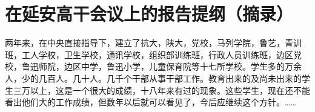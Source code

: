 \section[在延安高干会议上的报告提纲（摘录）（一九三九年六月十日）]{在延安高干会议上的报告提纲（摘录）}


两年来，在中央直接指导下，建立了抗大，陕大，党校，马列学院，鲁艺，青训班，工人学校，卫生学校，通讯学校，组织部训练班，行政人员训练班，边区党校，鲁迅师院，边区中学，鲁迅小学，儿童保育院等十七所学校。学生多的万余人，少的几百人。几十人。几千个干部从事干部工作。教育出来的及尚未出来的学生三万以上，这是一个很大的成绩，十八年来有过的现象。这些学生，现在还不能看出他们大的工作成绩，但数年以后就可以看见了，今后应继续这个方针。……

